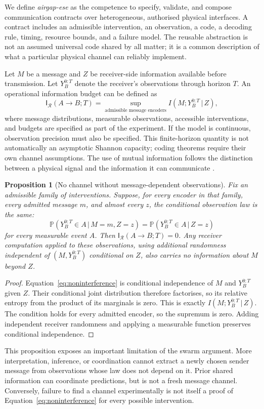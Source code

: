 \documentclass[11pt,a4paper]{article}
\newtheorem{proposition}[theorem]{Proposition}
\theoremstyle{definition}
\theoremstyle{remark}
\newcommand{\Prob}{\mathbb{P}}
\newcommand{\calR}{\mathcal{R}}
\newcommand{\given}{\,\vert\,}
\begin{document}
We define \emph{airgap-ese} as the competence to specify, validate, and compose communication contracts over heterogeneous, authorised physical interfaces. A contract includes an admissible intervention, an observation, a code, a decoding rule, timing, resource bounds, and a failure model. The reusable abstraction is not an assumed universal code shared by all matter; it is a common description of what a particular physical channel can reliably implement.

Let $M$ be a message and $Z$ be receiver-side information available before transmission. Let $Y_B^{0:T}$ denote the receiver's observations through horizon $T$. An operational information budget can be defined as
\begin{equation}\label{eq:infobudget}
 \mathsf I_{\calR}(A\!\to\!B;T)
 =\sup_{\text{admissible message encoders}}
 I(M;Y_B^{0:T}\given Z),
\end{equation}
where message distributions, measurable observations, accessible interventions, and budgets are specified as part of the experiment. If the model is continuous, observation precision must also be specified. This finite-horizon quantity is not automatically an asymptotic Shannon capacity; coding theorems require their own channel assumptions. The use of mutual information follows the distinction between a physical signal and the information it can communicate \citep{shannon}.

\begin{proposition}[No channel without message-dependent observations]\label{prop:noninterference}
Fix an admissible family of interventions. Suppose, for every encoder in that family, every admitted message $m$, and almost every $z$, the conditional observation law is the same:
\begin{equation}\label{eq:noninterference}
 \Prob(Y_B^{0:T}\in A\given M=m,Z=z)
 =\Prob(Y_B^{0:T}\in A\given Z=z)
\end{equation}
for every measurable event $A$. Then $\mathsf I_{\calR}(A\!\to\!B;T)=0$. Any receiver computation applied to these observations, using additional randomness independent of $(M,Y_B^{0:T})$ conditional on $Z$, also carries no information about $M$ beyond $Z$.
\end{proposition}
\begin{proof}
Equation~\eqref{eq:noninterference} is conditional independence of $M$ and $Y_B^{0:T}$ given $Z$. Their conditional joint distribution therefore factorises, so its relative entropy from the product of its marginals is zero. This is exactly $I(M;Y_B^{0:T}\given Z)$. The condition holds for every admitted encoder, so the supremum is zero. Adding independent receiver randomness and applying a measurable function preserves conditional independence.
\end{proof}
This proposition exposes an important limitation of the swarm argument. More interpretation, inference, or coordination cannot extract a newly chosen sender message from observations whose law does not depend on it. Prior shared information can coordinate predictions, but is not a fresh message channel. Conversely, failure to find a channel experimentally is not itself a proof of Equation~\eqref{eq:noninterference} for every possible intervention.
\end{document}
